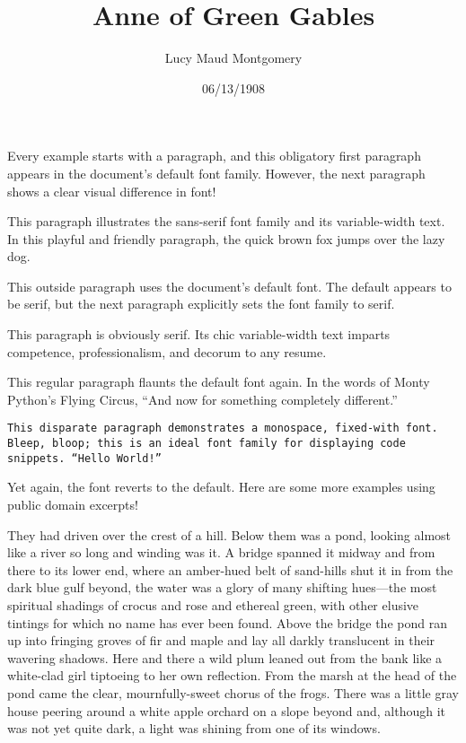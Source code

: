 \documentclass[a4paper]{article}
\title{Anne of Green Gables}
\author{Lucy Maud Montgomery}
\date{06/13/1908}
\begin{document}
\maketitle

Every example starts with a paragraph, and this obligatory first paragraph appears in the document's default font family. However, the next paragraph shows a clear visual difference in font!

\textsf{This paragraph illustrates the sans-serif font family and its variable-width text. In this playful and friendly paragraph, the quick brown fox jumps over the lazy dog.}

This outside paragraph uses the document's default font. The default appears to be serif, but the next paragraph explicitly sets the font family to serif.

\textrm{This paragraph is obviously serif. Its chic variable-width text imparts competence, professionalism, and decorum to any resume.}

This regular paragraph flaunts the default font again. In the words of Monty Python's Flying Circus, ``And now for something completely different.''

\texttt{This disparate paragraph demonstrates a monospace, fixed-with font. Bleep, bloop; this is an ideal font family for displaying code snippets. ``Hello World!''}

Yet again, the font reverts to the default. Here are some more examples using public domain excerpts!

\textsf{They had driven over the crest of a hill. Below them was a pond, looking almost like a river so long and winding was it. A bridge spanned it midway and from there to its lower end, where an amber-hued belt of sand-hills shut it in from the dark blue gulf beyond, the water was a glory of many shifting hues---the most spiritual shadings of crocus and rose and ethereal green, with other elusive tintings for which no name has ever been found. Above the bridge the pond ran up into fringing groves of fir and maple and lay all darkly translucent in their wavering shadows. Here and there a wild plum leaned out from the bank like a white-clad girl tiptoeing to her own reflection. From the marsh at the head of the pond came the clear, mournfully-sweet chorus of the frogs. There was a little gray house peering around a white apple orchard on a slope beyond and, although it was not yet quite dark, a light was shining from one of its windows.}
\end{document}
